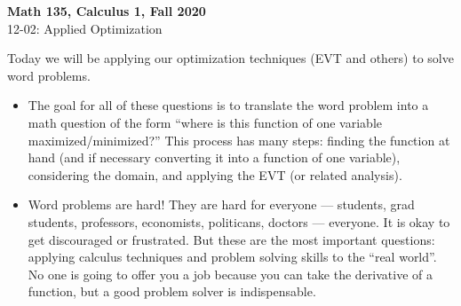 \documentclass[11pt,reqno,final]{amsart}
\numberwithin{figure}{section}
\theoremstyle{definition} %
\begin{document}
\begin{center}
        \textbf{\Large Math 135, Calculus 1, Fall 2020}\\[10pt]
        {\large 12-02: Applied Optimization}
\end{center}

\thispagestyle{empty}


\renewcommand{\thesection}{\Alph{section}}

Today we will be applying our optimization techniques (EVT and others) to solve word problems.
\begin{itemize}
\item The goal for all of these questions is to translate the word problem into a math question of the form
        ``where is this function of one variable maximized/minimized?''
        This process has many steps: finding the function at hand (and if necessary converting it into a function of one variable), considering the domain, and applying the EVT (or related analysis).
\item Word problems are hard! They are hard for everyone --- students, grad students, professors, economists, politicans, doctors --- everyone.
        It is okay to get discouraged or frustrated. But these are the most important questions: applying calculus techniques and problem solving skills to the ``real world''.
        No one is going to offer you a job because you can take the derivative of a function, but a good problem solver is indispensable. 
\end{itemize}
\end{document}

